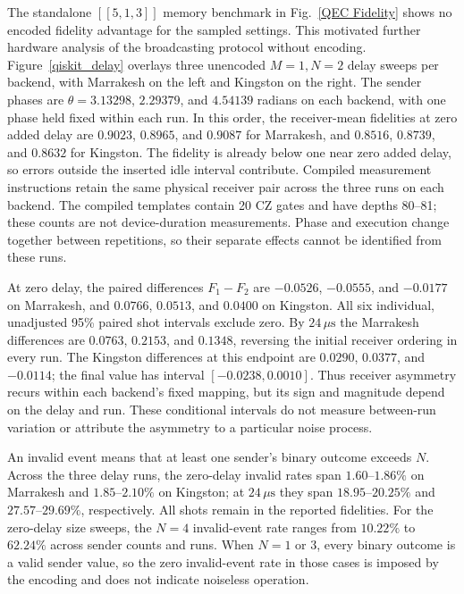 \documentclass[aps,physrev,10pt,twocolumn,superscriptaddress,floatfix]{revtex4-2}
\begin{document}
The standalone $[[5,1,3]]$ memory benchmark in Fig.~\ref{QEC Fidelity} shows no encoded fidelity advantage for the sampled settings. This motivated further hardware analysis of the broadcasting protocol without encoding. Figure~\ref{qiskit_delay} overlays three unencoded $M=1,N=2$ delay sweeps per backend, with Marrakesh on the left and Kingston on the right. The sender phases are $\theta=3.13298$, $2.29379$, and $4.54139$ radians on each backend, with one phase held fixed within each run. In this order, the receiver-mean fidelities at zero added delay are $0.9023$, $0.8965$, and $0.9087$ for Marrakesh, and $0.8516$, $0.8739$, and $0.8632$ for Kingston. The fidelity is already below one near zero added delay, so errors outside the inserted idle interval contribute. Compiled measurement instructions retain the same physical receiver pair across the three runs on each backend. The compiled templates contain 20 CZ gates and have depths 80--81; these counts are not device-duration measurements. Phase and execution change together between repetitions, so their separate effects cannot be identified from these runs.

At zero delay, the paired differences $F_1-F_2$ are $-0.0526$, $-0.0555$, and $-0.0177$ on Marrakesh, and $0.0766$, $0.0513$, and $0.0400$ on Kingston. All six individual, unadjusted 95\% paired shot intervals exclude zero. By $24\,\mu\mathrm{s}$ the Marrakesh differences are $0.0763$, $0.2153$, and $0.1348$, reversing the initial receiver ordering in every run. The Kingston differences at this endpoint are $0.0290$, $0.0377$, and $-0.0114$; the final value has interval $[-0.0238,0.0010]$. Thus receiver asymmetry recurs within each backend's fixed mapping, but its sign and magnitude depend on the delay and run. These conditional intervals do not measure between-run variation or attribute the asymmetry to a particular noise process.

An invalid event means that at least one sender's binary outcome exceeds $N$. Across the three delay runs, the zero-delay invalid rates span $1.60$--$1.86\%$ on Marrakesh and $1.85$--$2.10\%$ on Kingston; at $24\,\mu\mathrm{s}$ they span $18.95$--$20.25\%$ and $27.57$--$29.69\%$, respectively. All shots remain in the reported fidelities. For the zero-delay size sweeps, the $N=4$ invalid-event rate ranges from $10.22\%$ to $62.24\%$ across sender counts and runs. When $N=1$ or $3$, every binary outcome is a valid sender value, so the zero invalid-event rate in those cases is imposed by the encoding and does not indicate noiseless operation.
\end{document}
